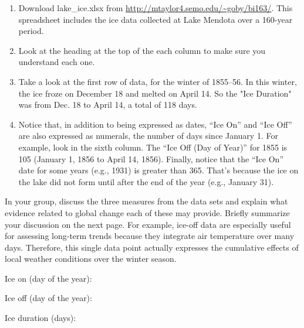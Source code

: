 \documentclass[12pt, hidelinks, addpoints]{exam}
\begin{document}
\begin{enumerate}

\item Download lake\_ice.xlsx from \url{http://mtaylor4.semo.edu/~goby/bi163/}. This spreadsheet includes the
ice data collected at Lake Mendota over a 160-year period.

\item Look at the heading at the top of the each column to make sure you
understand each one.

\item Take a look at the first row of data, for the winter of 1855–56. In
this winter, the ice froze on December 18 and melted on April 14. So the
"Ice Duration" was from Dec. 18 to April 14, a total of 118 days.

\item Notice that, in addition to being expressed as dates, ``Ice On'' and
``Ice Off'' are also expressed as numerals, the number of days since
January 1. For example, look in the sixth column. The ``Ice Off (Day of
Year)'' for 1855 is 105 (January 1, 1856 to April 14, 1856). Finally,
notice that the ``Ice On'' date for some years (e.g., 1931) is greater
than 365. That's because the ice on the lake did not form until after
the end of the year (e.g., January 31).
\end{enumerate}

In your group, discuss the three measures from the data sets and explain
what evidence related to global change each of these may provide. Briefly 
summarize your discussion on the next page.  For
example, ice-off data are especially useful for assessing long-term
trends because they integrate air temperature over many days. Therefore,
this single data point actually expresses the cumulative effects of
local weather conditions over the winter season. 

Ice on (day of the year):\vspace*{2\baselineskip}

Ice off (day of the year):\vspace*{2\baselineskip}

Ice duration (days):\vspace*{2\baselineskip}
\end{document}
